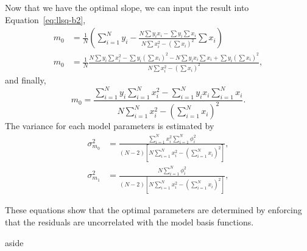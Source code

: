 {\[    \]
    Now that we have the optimal slope, we can input the result into Equation~\ref{eq:llsq-b2},
    \begin{align*}
        m_0 &= \frac{1}{N} \left(\sum_{i=1}^N y_i - 
        \frac{\displaystyle N \sum y_i x_i 
        - \sum y_i \sum x_i}
        {\displaystyle N \sum x_i^2 - \left(\sum x_i \right)^2}
        \sum x_i \right) \\
        m_0 &= \frac{1}{N} 
        \frac{\displaystyle N \sum y_i \sum x_i^2 
        - \sum y_i \left(\sum x_i \right)^2 
        - N \sum y_i x_i \sum x_i
        + \sum y_i \left(\sum x_i\right)^2}
        {\displaystyle N \sum x_i^2 - \left(\sum x_i \right)^2} ,
    \end{align*}
    and finally,
    \[
        m_0 = \frac{\displaystyle \sum_{i=1}^N y_i \sum_{i=1}^N x_i^2 
        - \sum_{i=1}^N y_i x_i \sum_{i=1}^N x_i}
        {\displaystyle N \sum_{i=1}^N x_i^2 - \left(\sum_{i=1}^N x_i \right)^2} .
    \]
    The variance for each model parameters is estimated by
    \begin{align*}
        \sigma_{m_0}^2 &= \frac{\displaystyle \sum_{i=1}^N x_i^2 \sum_{i=1}^N \phi_i^2}
        {\displaystyle (N - 2) 
        \left[ N \sum_{i=1}^N x_i^2 - \left(\sum_{i=1}^N x_i \right)^2 \right]} , \\
        \sigma_{m_1}^2 &= \frac{\displaystyle N \sum_{i=1}^N \phi_i^2}
        {\displaystyle (N - 2) 
        \left[ N \sum_{i=1}^N x_i^2 - \left(\sum_{i=1}^N x_i \right)^2 \right]} ,
    \end{align*}

    These equations show that the optimal parameters are determined by enforcing that the residuals are uncorrelated with the model basis functions.
}{aside}\label{box:llsq}

